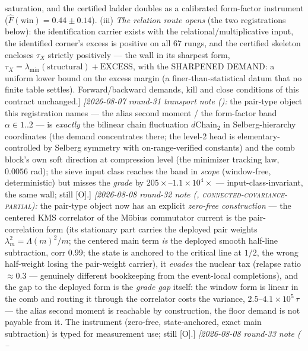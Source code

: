 \documentclass[11pt,a4paper]{article}
\begin{document}
{saturation, and the certified ladder doubles as a calibrated
form-factor instrument ($\hat F(\mathrm{win}) = 0.44 \pm 0.14$).
(iii) \emph{The relation route opens} (the two registrations
below): the identification carrier exists with the
relational/multiplicative input, the identified corner's excess
is positive on all $67$ rungs, and the certified skeleton
encloses $\tau_X$ strictly positively --- the wall in its
sharpest form, $\tau_X = \lambda_{\min}(\text{structural}) +
\text{EXCESS}$, with the SHARPENED DEMAND: a uniform lower bound
on the excess margin (a finer-than-statistical datum that no
finite table settles).  Forward/backward demands, kill and close
conditions of this contract unchanged.]
\emph{[2026-08-07 round-31 transport note
():} the pair-type object this
registration names --- the alias second moment / the form-factor
band $\alpha \in 1..2$ --- is \emph{exactly} the bilinear chain
fluctuation $d\mathrm{Chain}_2$ in Selberg-hierarchy coordinates
(the demand concentrates there; the level-2 head is
elementary-controlled by Selberg symmetry with on-range-verified
constants) and the comb block's own soft direction at
compression level (the minimizer tracking law, $0.0056$ rad);
the sieve input class reaches the band in \emph{scope}
(window-free, deterministic) but misses the \emph{grade} by
$205\times$--$1.1\times10^4\times$ --- input-class-invariant,
the same wall; still [O].]
\emph{[2026-08-08 round-32 note
(,
\textsc{connected-covariance-partial}):} the pair-type object
now has an explicit \emph{zero-free construction} --- the
centered KMS correlator of the M\"obius commutator current is
the pair-correlation form (its stationary part carries the
deployed pair weights $\lambda_m^2 = \Lambda(m)^2/m$; the
centered main term \emph{is} the deployed smooth half-line
subtraction, corr $0.99$; the state is anchored to the critical
line at $1/2$, the wrong half-weight losing the pair-weight
carrier), it \emph{evades} the nuclear tax (relapse ratio
$\approx 0.3$ --- genuinely different bookkeeping from the
event-local completions), and the gap to the deployed form is
the \emph{grade gap} itself: the window form is linear in the
comb and routing it through the correlator costs the variance,
$2.5$--$4.1\times10^5\,\tau$ --- the alias second moment is
reachable by construction, the floor demand is not payable from
it.  The instrument (zero-free, state-anchored, exact main
subtraction) is typed for measurement use; still [O].]
\emph{[2026-08-08 round-33 note
( --
}}
\end{document}
